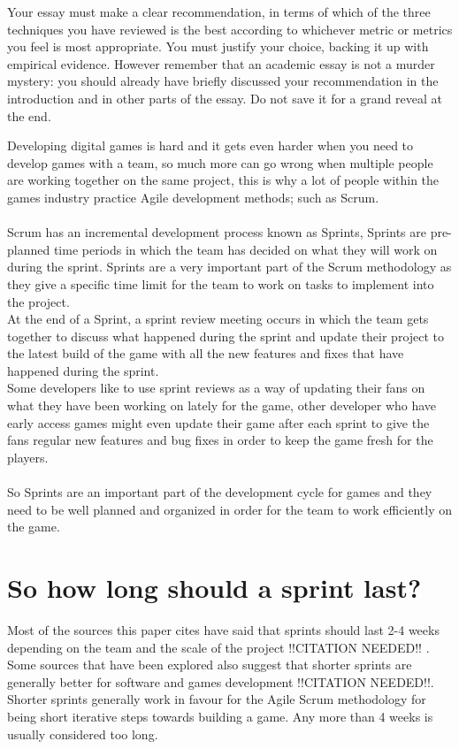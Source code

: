 \documentclass{scrartcl}
\begin{document}
Your essay must make a clear recommendation, in terms of which of the three techniques you have reviewed is the best according to whichever metric or metrics you feel is most appropriate. You must justify your choice, backing it up with empirical evidence. However remember that an academic essay is not a murder mystery: you should already have briefly discussed your recommendation in the introduction and in other parts of the essay. Do not save it for a grand reveal at the end.
\fi

Developing digital games is hard and it gets even harder when you need to develop games with a team, so much more can go wrong when multiple people are working together on the same project, this is why a lot of people within the games industry practice Agile development methods; such as Scrum.
\\~\\
Scrum has an incremental development process known as Sprints, Sprints are pre-planned time periods in which the team has decided on what they will work on during the sprint. Sprints are a very important part of the Scrum methodology as they give a specific time limit for the team to work on tasks to implement into the project.\\
At the end of a Sprint, a sprint review meeting occurs in which the team gets together to discuss what happened during the sprint and update their project to the latest build of the game with all the new features and fixes that have happened during the sprint.\\
Some developers like to use sprint reviews as a way of updating their fans on what they have been working on lately for the game, other developer who have early access games might even update their game after each sprint to give the fans regular new features and bug fixes in order to keep the game fresh for the players.
\\~\\
So Sprints are an important part of the development cycle for games and they need to be well planned and organized in order for the team to work efficiently on the game.

\section{So how long should a sprint last?}
Most of the sources this paper cites have said that sprints should last 2-4 weeks depending on the team and the scale of the project !!CITATION NEEDED!!\cite{two} \cite{three} \cite{four} \cite{five}. Some sources that have been explored also suggest that shorter sprints are generally better for software and games development !!CITATION NEEDED!!. Shorter sprints generally work in favour for the Agile Scrum methodology for being short iterative steps towards building a game. Any more than 4 weeks is usually considered too long.
\end{document}
